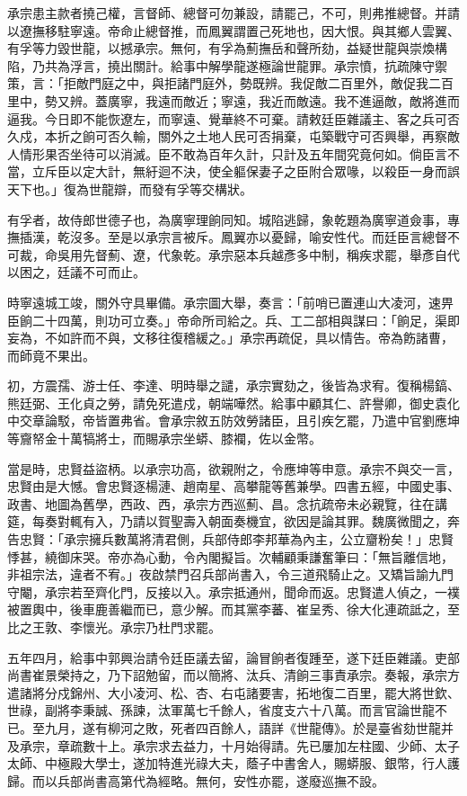 \begin{pinyinscope}
承宗患主款者撓己權，言督師、總督可勿兼設，請罷己，不可，則弗推總督。并請以遼撫移駐寧遠。帝命止總督推，而鳳翼謂置己死地也，因大恨。與其鄉人雲翼、有孚等力毀世龍，以撼承宗。無何，有孚為薊撫岳和聲所劾，益疑世龍與崇煥構陷，乃共為浮言，撓出關計。給事中解學龍遂極論世龍罪。承宗憤，抗疏陳守禦策，言：「拒敵門庭之中，與拒諸門庭外，勢既辨。我促敵二百里外，敵促我二百里中，勢又辨。蓋廣寧，我遠而敵近；寧遠，我近而敵遠。我不進逼敵，敵將進而逼我。今日即不能恢遼左，而寧遠、覺華終不可棄。請敕廷臣雜議主、客之兵可否久戍，本折之餉可否久輸，關外之土地人民可否捐棄，屯築戰守可否興舉，再察敵人情形果否坐待可以消滅。臣不敢為百年久計，只計及五年間究竟何如。倘臣言不當，立斥臣以定大計，無紆迴不決，使全軀保妻子之臣附合眾喙，以殺臣一身而誤天下也。」復為世龍辯，而發有孚等交構狀。

有孚者，故侍郎世德子也，為廣寧理餉同知。城陷逃歸，象乾題為廣寧道僉事，專撫插漢，乾沒多。至是以承宗言被斥。鳳翼亦以憂歸，喻安性代。而廷臣言總督不可裁，命吳用先督薊、遼，代象乾。承宗惡本兵越彥多中制，稱疾求罷，舉彥自代以困之，廷議不可而止。

時寧遠城工竣，關外守具畢備。承宗圖大舉，奏言：「前哨已置連山大凌河，速畀臣餉二十四萬，則功可立奏。」帝命所司給之。兵、工二部相與謀曰：「餉足，渠即妄為，不如許而不與，文移往復稽緩之。」承宗再疏促，具以情告。帝為飭諸曹，而師竟不果出。

初，方震孺、游士任、李達、明時舉之譴，承宗實劾之，後皆為求宥。復稱楊鎬、熊廷弼、王化貞之勞，請免死遣戍，朝端嘩然。給事中顧其仁、許譽卿，御史袁化中交章論駁，帝皆置弗省。會承宗敘五防效勞諸臣，且引疾乞罷，乃遣中官劉應坤等齎帑金十萬犒將士，而賜承宗坐蟒、膝襴，佐以金幣。

當是時，忠賢益盜柄。以承宗功高，欲親附之，令應坤等申意。承宗不與交一言，忠賢由是大憾。會忠賢逐楊漣、趙南星、高攀龍等舊兼學。四書五經，中國史事、政書、地圖為舊學，西政、西，承宗方西巡薊、昌。念抗疏帝未必親覽，往在講筵，每奏對輒有入，乃請以賀聖壽入朝面奏機宜，欲因是論其罪。魏廣微聞之，奔告忠賢：「承宗擁兵數萬將清君側，兵部侍郎李邦華為內主，公立齏粉矣！」忠賢悸甚，繞御床哭。帝亦為心動，令內閣擬旨。次輔顧秉謙奮筆曰：「無旨離信地，非祖宗法，違者不宥。」夜啟禁門召兵部尚書入，令三道飛騎止之。又矯旨諭九門守閹，承宗若至齊化門，反接以入。承宗抵通州，聞命而返。忠賢遣人偵之，一襆被置輿中，後車鹿善繼而已，意少解。而其黨李蕃、崔呈秀、徐大化連疏詆之，至比之王敦、李懷光。承宗乃杜門求罷。

五年四月，給事中郭興治請令廷臣議去留，論冒餉者復踵至，遂下廷臣雜議。吏部尚書崔景榮持之，乃下詔勉留，而以簡將、汰兵、清餉三事責承宗。奏報，承宗方遣諸將分戍錦州、大小凌河、松、杏、右屯諸要害，拓地復二百里，罷大將世欽、世祿，副將李秉誠、孫諫，汰軍萬七千餘人，省度支六十八萬。而言官論世龍不已。至九月，遂有柳河之敗，死者四百餘人，語詳《世龍傳》。於是臺省劾世龍并及承宗，章疏數十上。承宗求去益力，十月始得請。先已屢加左柱國、少師、太子太師、中極殿大學士，遂加特進光祿大夫，蔭子中書舍人，賜蟒服、銀幣，行人護歸。而以兵部尚書高第代為經略。無何，安性亦罷，遂廢巡撫不設。


\end{pinyinscope}
